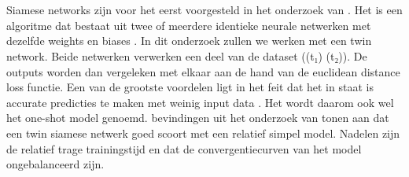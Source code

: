 \section{}%
\label{sec:siamese-netwerken}

Siamese networks zijn voor het eerst voorgesteld in het onderzoek van \textcite{NIPS1993_288cc0ff}. Het is een algoritme dat bestaat uit
twee of meerdere identieke neurale netwerken met dezelfde weights en biases \autocite{Serrano_2023}.
In dit onderzoek zullen we werken met een twin network. Beide netwerken verwerken een deel van de dataset ((t₁)  (t₂)).
De outputs worden dan vergeleken met elkaar aan de hand van de euclidean distance loss functie. 
Een van de grootste voordelen ligt in het feit dat het in staat is accurate predicties te maken met weinig input data \autocite{koch2015siamese}. 
Het wordt daarom ook wel het one-shot model genoemd.
\newline
bevindingen uit het onderzoek van \textcite{Fang2019} tonen aan dat een twin siamese netwerk goed scoort met een relatief simpel model. 
Nadelen zijn de relatief trage trainingstijd en dat de convergentiecurven van het model ongebalanceerd zijn.
\newline
\newline

